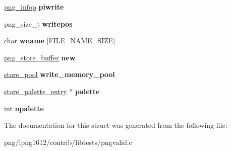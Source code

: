 \begin{DoxyCompactItemize}
\item 
\hypertarget{structpng__store_aeea796b011c918581dabf71ecfbaaee5}{\hyperlink{structpng__info__def}{png\+\_\+infop} {\bfseries piwrite}}\label{structpng__store_aeea796b011c918581dabf71ecfbaaee5}

\item 
\hypertarget{structpng__store_a4d301ac11caa086c5a88b5ad201cf7c6}{png\+\_\+size\+\_\+t {\bfseries writepos}}\label{structpng__store_a4d301ac11caa086c5a88b5ad201cf7c6}

\item 
\hypertarget{structpng__store_ac8ee08642590ca2287e6613e1e415f3f}{char {\bfseries wname} \mbox{[}F\+I\+L\+E\+\_\+\+N\+A\+M\+E\+\_\+\+S\+I\+Z\+E\mbox{]}}\label{structpng__store_ac8ee08642590ca2287e6613e1e415f3f}

\item 
\hypertarget{structpng__store_a0791499e5a2c8b8218e04b18a1a9e730}{\hyperlink{structpng__store__buffer}{png\+\_\+store\+\_\+buffer} {\bfseries new}}\label{structpng__store_a0791499e5a2c8b8218e04b18a1a9e730}

\item 
\hypertarget{structpng__store_afe84ee12c875715841c4c876545d4967}{\hyperlink{structstore__pool}{store\+\_\+pool} {\bfseries write\+\_\+memory\+\_\+pool}}\label{structpng__store_afe84ee12c875715841c4c876545d4967}

\item 
\hypertarget{structpng__store_a519fb8d38275767f948d4bbdbd2acf2d}{\hyperlink{structstore__palette__entry}{store\+\_\+palette\+\_\+entry} $\ast$ {\bfseries palette}}\label{structpng__store_a519fb8d38275767f948d4bbdbd2acf2d}

\item 
\hypertarget{structpng__store_a49d8830ef59f2226766d12f0f0fa90f9}{int {\bfseries npalette}}\label{structpng__store_a49d8830ef59f2226766d12f0f0fa90f9}

\end{DoxyCompactItemize}


The documentation for this struct was generated from the following file\+:\begin{DoxyCompactItemize}
\item 
png/lpng1612/contrib/libtests/pngvalid.\+c\end{DoxyCompactItemize}
